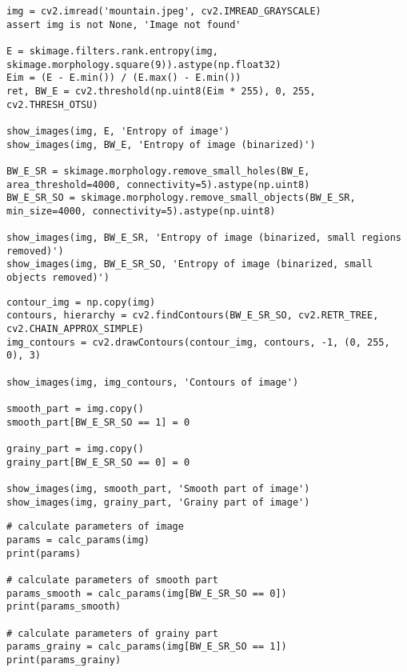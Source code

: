 \begin{lstlisting}[caption={Исзодный код для выделения текстурных областей}]
img = cv2.imread('mountain.jpeg', cv2.IMREAD_GRAYSCALE)
assert img is not None, 'Image not found'

E = skimage.filters.rank.entropy(img, skimage.morphology.square(9)).astype(np.float32)
Eim = (E - E.min()) / (E.max() - E.min())
ret, BW_E = cv2.threshold(np.uint8(Eim * 255), 0, 255, cv2.THRESH_OTSU)

show_images(img, E, 'Entropy of image')
show_images(img, BW_E, 'Entropy of image (binarized)')

BW_E_SR = skimage.morphology.remove_small_holes(BW_E, area_threshold=4000, connectivity=5).astype(np.uint8)
BW_E_SR_SO = skimage.morphology.remove_small_objects(BW_E_SR, min_size=4000, connectivity=5).astype(np.uint8)

show_images(img, BW_E_SR, 'Entropy of image (binarized, small regions removed)')
show_images(img, BW_E_SR_SO, 'Entropy of image (binarized, small objects removed)')
\end{lstlisting}

\begin{lstlisting}[caption={Исходной код для выделения контуров текстур}]
contour_img = np.copy(img)
contours, hierarchy = cv2.findContours(BW_E_SR_SO, cv2.RETR_TREE, cv2.CHAIN_APPROX_SIMPLE)
img_contours = cv2.drawContours(contour_img, contours, -1, (0, 255, 0), 3)

show_images(img, img_contours, 'Contours of image')

smooth_part = img.copy()
smooth_part[BW_E_SR_SO == 1] = 0 

grainy_part = img.copy()
grainy_part[BW_E_SR_SO == 0] = 0

show_images(img, smooth_part, 'Smooth part of image')
show_images(img, grainy_part, 'Grainy part of image')
\end{lstlisting}

\begin{lstlisting}[caption={Исзодный код для расчета параметров текстур областей}]
# calculate parameters of image 
params = calc_params(img)
print(params)

# calculate parameters of smooth part
params_smooth = calc_params(img[BW_E_SR_SO == 0])
print(params_smooth)

# calculate parameters of grainy part
params_grainy = calc_params(img[BW_E_SR_SO == 1])
print(params_grainy)
\end{lstlisting}
